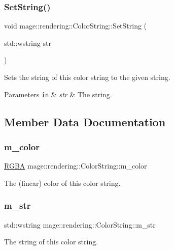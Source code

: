 \subsubsection{\texorpdfstring{Set\+String()}{SetString()}}
{\footnotesize\ttfamily void mage\+::rendering\+::\+Color\+String\+::\+Set\+String (\begin{DoxyParamCaption}\item[{std\+::wstring}]{str }\end{DoxyParamCaption})\hspace{0.3cm}{\ttfamily [noexcept]}}

Sets the string of this color string to the given string.


\begin{DoxyParams}[1]{Parameters}
\mbox{\tt in}  & {\em str} & The string. \\
\hline
\end{DoxyParams}


\subsection{Member Data Documentation}
\mbox{\label{classmage_1_1rendering_1_1_color_string_a6b062bfa44b3786c5e8f2e8d18a373ca}} 
\subsubsection{\texorpdfstring{m\+\_\+color}{m\_color}}
{\footnotesize\ttfamily \mbox{\hyperlink{structmage_1_1_r_g_b_a}{R\+G\+BA}} mage\+::rendering\+::\+Color\+String\+::m\+\_\+color\hspace{0.3cm}{\ttfamily [private]}}

The (linear) color of this color string. \mbox{\label{classmage_1_1rendering_1_1_color_string_af19cfa7bbdd66a1f83dd44dd9533f5ed}} 
\subsubsection{\texorpdfstring{m\+\_\+str}{m\_str}}
{\footnotesize\ttfamily std\+::wstring mage\+::rendering\+::\+Color\+String\+::m\+\_\+str\hspace{0.3cm}{\ttfamily [private]}}

The string of this color string. 